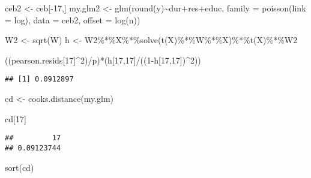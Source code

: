 \documentclass[
]{book}
\newenvironment{Shaded}{\begin{snugshade}}{\end{snugshade}}
\newcommand{\AttributeTok}[1]{\textcolor[rgb]{0.77,0.63,0.00}{#1}}
\newcommand{\DecValTok}[1]{\textcolor[rgb]{0.00,0.00,0.81}{#1}}
\newcommand{\FunctionTok}[1]{\textcolor[rgb]{0.00,0.00,0.00}{#1}}
\newcommand{\NormalTok}[1]{#1}
\newcommand{\OtherTok}[1]{\textcolor[rgb]{0.56,0.35,0.01}{#1}}
\newcommand{\SpecialCharTok}[1]{\textcolor[rgb]{0.00,0.00,0.00}{#1}}
\newcommand{\StringTok}[1]{\textcolor[rgb]{0.31,0.60,0.02}{#1}}
\begin{document}
\begin{Shaded}
\begin{Highlighting}[]
\NormalTok{ceb2 }\OtherTok{\textless{}{-}}\NormalTok{ ceb[}\SpecialCharTok{{-}}\DecValTok{17}\NormalTok{,]}
\NormalTok{my.glm2 }\OtherTok{\textless{}{-}} \FunctionTok{glm}\NormalTok{(}\FunctionTok{round}\NormalTok{(y)}\SpecialCharTok{\textasciitilde{}}\NormalTok{dur}\SpecialCharTok{+}\NormalTok{res}\SpecialCharTok{+}\NormalTok{educ, }\AttributeTok{family =} \FunctionTok{poisson}\NormalTok{(}\AttributeTok{link =} \StringTok{\textquotesingle{}log\textquotesingle{}}\NormalTok{), }\AttributeTok{data =}\NormalTok{ ceb2, }\AttributeTok{offset =} \FunctionTok{log}\NormalTok{(n))}

\NormalTok{W2 }\OtherTok{\textless{}{-}} \FunctionTok{sqrt}\NormalTok{(W)}
\NormalTok{h }\OtherTok{\textless{}{-}}\NormalTok{ W2}\SpecialCharTok{\%*\%}\NormalTok{X}\SpecialCharTok{\%*\%}\FunctionTok{solve}\NormalTok{(}\FunctionTok{t}\NormalTok{(X)}\SpecialCharTok{\%*\%}\NormalTok{W}\SpecialCharTok{\%*\%}\NormalTok{X)}\SpecialCharTok{\%*\%}\FunctionTok{t}\NormalTok{(X)}\SpecialCharTok{\%*\%}\NormalTok{W2}

\NormalTok{((pearson.resids[}\DecValTok{17}\NormalTok{]}\SpecialCharTok{\^{}}\DecValTok{2}\NormalTok{)}\SpecialCharTok{/}\NormalTok{p)}\SpecialCharTok{*}\NormalTok{(h[}\DecValTok{17}\NormalTok{,}\DecValTok{17}\NormalTok{]}\SpecialCharTok{/}\NormalTok{((}\DecValTok{1}\SpecialCharTok{{-}}\NormalTok{h[}\DecValTok{17}\NormalTok{,}\DecValTok{17}\NormalTok{])}\SpecialCharTok{\^{}}\DecValTok{2}\NormalTok{))}
\end{Highlighting}
\end{Shaded}

\begin{verbatim}
## [1] 0.0912897
\end{verbatim}

\begin{Shaded}
\begin{Highlighting}[]
\NormalTok{cd }\OtherTok{\textless{}{-}} \FunctionTok{cooks.distance}\NormalTok{(my.glm)}

\NormalTok{cd[}\DecValTok{17}\NormalTok{]}
\end{Highlighting}
\end{Shaded}

\begin{verbatim}
##         17 
## 0.09123744
\end{verbatim}

\begin{Shaded}
\begin{Highlighting}[]
\FunctionTok{sort}\NormalTok{(cd)}
\end{Highlighting}
\end{Shaded}
\end{document}
